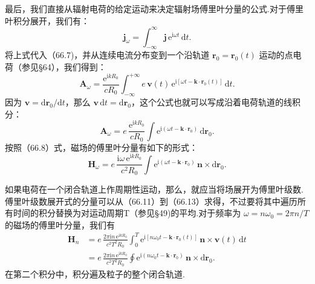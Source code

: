 最后，我们直接从辐射电荷的给定运动来决定辐射场傅里叶分量的公式.对于傅里叶积分展开，我们有：
\begin{equation*}
  \boldsymbol{j}_\omega=\int_{-\infty}^{\infty}\boldsymbol{j}\,\mathrm{e}^{\mathrm{i}\omega t}\,\mathrm{d}t.
\end{equation*}
将上式代入（66.7)，并从连续电流分布变到一个沿轨道 $\boldsymbol{r}_0=\boldsymbol{r}_0(t)$ 运动的点电荷（参见§64），我们得到：
\begin{equation}
  \boldsymbol{A}_\omega=\frac{\mathrm{e}^{\mathrm{i}kR_0}}{cR_0}\int_{-\infty}^{+\infty}e\,\boldsymbol{v}(t)\,\mathrm{e}^{\mathrm{i}[\omega t-\boldsymbol{k}\cdot\boldsymbol{r}_0(t)]}\,\mathrm{d}t.
\end{equation}
因为 $\boldsymbol{v}=\mathrm{d}\boldsymbol{r}_0/\mathrm{d}t$，那么 $\boldsymbol{v}\,\mathrm{d}t=\mathrm{d}\boldsymbol{r}_0$，这个公式也就可以写成沿着电荷轨道的线积分：
\begin{equation}
  \boldsymbol{A}_\omega=e\,\frac{\mathrm{e}^{\mathrm{i}kR_0}}{cR_0}\int\mathrm{e}^{\mathrm{i}(\omega t-\boldsymbol{k}\cdot\boldsymbol{r}_0)}\,\mathrm{d}\boldsymbol{r}_0.
\end{equation}
按照（66.8）式，磁场的傅里叶分量有如下的形式：
\begin{equation}
  \boldsymbol{H}_\omega=e\,\frac{\mathrm{i}\omega\,\mathrm{e}^{\mathrm{i}kR_0}}{c^2R_0}\int\mathrm{e}^{\mathrm{i}(\omega t-\boldsymbol{k}\cdot\boldsymbol{r}_0)}\,\boldsymbol{n}\times\mathrm{d}\boldsymbol{r}_0.
\end{equation}

如果电荷在一个闭合轨道上作周期性运动，那么，就应当将场展开为傅里叶级数.傅里叶级数展开式的分量可以从（66.11）到（66.13）求得，不过要将其中遍历所有时间的积分替换为对运动周期T（参见§49)的平均.对于频率为 $\omega=n\omega_0=2\pi n/T$ 的磁场的傅里叶分量，我们有
\begin{equation}
\begin{aligned}
  \boldsymbol{H}_n&=e\,\frac{2\pi\mathrm{i}n\,\mathrm{e}^{\mathrm{i}kR_0}}{c^2T^2R_0}
  \int_0^T\mathrm{e}^{\mathrm{i}[n\omega_0t-\boldsymbol{k}\cdot\boldsymbol{r}_0(t)]}\,\boldsymbol{n}\times\boldsymbol{v}(t)\,\mathrm{d}t\\
  &=e\,\frac{2\pi\mathrm{i}n\,\mathrm{e}^{\mathrm{i}kR_0}}{c^2T^2R_0}
  \oint\mathrm{e}^{\mathrm{i}(n\omega_0t-\boldsymbol{k}\cdot\boldsymbol{r}_0)}\,\boldsymbol{n}\times\mathrm{d}\boldsymbol{r}_0.
\end{aligned}
\end{equation}
在第二个积分中，积分遍及粒子的整个闭合轨道.

